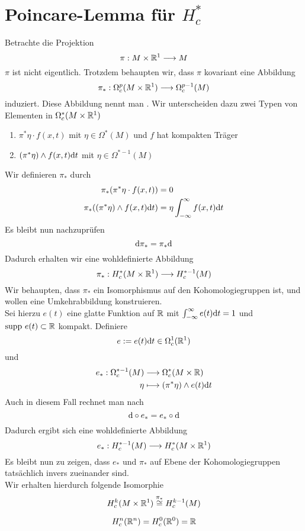 \section{Poincare-Lemma für $H^*_c$}
Betrachte die Projektion
\[ \pi : M \times \mathbb{R}^1 \overset{}{\longrightarrow} M \]
$\pi$ ist nicht eigentlich. Trotzdem behaupten wir, dass $\pi$ kovariant eine Abbildung
\[ \pi_* : \Omega^p_c(M \times \mathbb{R}^1) \overset{}{\longrightarrow} \Omega^{p-1}_c(M) \]
induziert. Diese Abbildung nennt man . Wir unterscheiden dazu zwei Typen von Elementen in $\Omega_c^*(M\times \mathbb{R}^1)$
\begin{enumerate}[(1)]
	\item $\pi^*\eta \cdot f(x,t)$ mit $\eta \in \Omega^*(M)$ und $f$ hat kompakten Träger
	\item $(\pi^*\eta)\wedge f(x,t) \text{d} t$ mit $\eta \in \Omega^{*-1}(M)$
\end{enumerate}
Wir definieren $\pi_*$ durch
\begin{align*}
\pi_*(\pi^*\eta \cdot f(x,t)) &= 0\\
\pi_*((\pi^*\eta)\wedge f(x,t) \text{d} t) &= \eta \int_{-\infty}^{\infty}f(x,t) \text{d} t
\end{align*}
Es bleibt nun nachzuprüfen
\[ \text{d} \pi_* = \pi_* \text{d} \]
Dadurch erhalten wir eine wohldefinierte Abbildung
\[ \pi_* : H^*_c(M\times \mathbb{R}^1) \overset{}{\longrightarrow} H^{*-1}_c(M) \]
Wir behaupten, dass $\pi_*$ ein Isomorphismus auf den Kohomologiegruppen ist, und wollen eine Umkehrabbildung konstruieren.\\
Sei hierzu $e(t)$ eine glatte Funktion auf $\mathbb{R}$ mit $\int_{-\infty}^{\infty}e(t) \text{d} t = 1$ und $\text{supp}\ e(t)\subset \mathbb{R}$ kompakt. Definiere
\[ e:= e(t) \text{d} t \in \Omega_c^1(\mathbb{R}^1) \]
und
\begin{align*}
e_* : \Omega_c^{*-1}(M) & \overset{}{\longrightarrow} \Omega_c^*(M\times \mathbb{R})\\
\eta & \longmapsto (\pi^*\eta) \wedge e(t) \text{d} t
\end{align*}
Auch in diesem Fall rechnet man nach
\[ \text{d} \circ e_* = e_* \circ \text{d} \]
Dadurch ergibt sich eine wohldefinierte Abbildung
\[ e_* : H_c^{*-1}(M) \overset{}{\longrightarrow} H_c^*(M\times \mathbb{R}^1) \]
Es bleibt nun zu zeigen, dass $e_*$ und $\pi_*$ auf Ebene der Kohomologiegruppen tatsächlich invers zueinander sind.\\
Wir erhalten hierdurch folgende Isomorphie
\[ H^k_c(M\times \mathbb{R}^1) \overset{\pi_*}{\cong} H^{k-1}_c(M) \]

\[ H^n_c(\mathbb{R}^n) = H^0_c(\mathbb{R}^0) = \mathbb{R} \]

